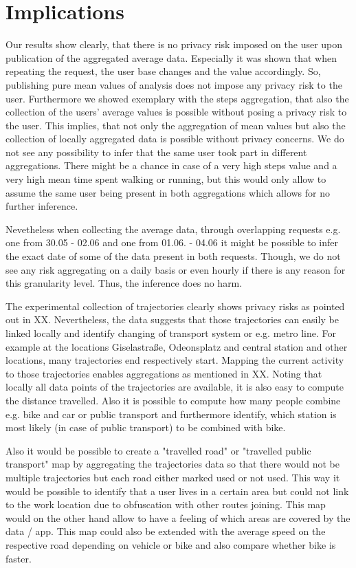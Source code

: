 \section{Implications}
Our results show clearly, that there is no privacy risk imposed on the user upon publication of the aggregated average data. Especially it was shown that when repeating the request, the user base changes and the value accordingly. So, publishing pure mean values of analysis does not impose any privacy risk to the user. Furthermore we showed exemplary with the steps aggregation, that also the collection of the users' average values is possible without posing a privacy risk to the user. This implies, that not only the aggregation of mean values but also the collection of locally aggregated data is possible without privacy concerns. We do not see any possibility to infer that the same user took part in different aggregations. There might be a chance in case of a very high steps value and a very high mean time spent walking or running, but this would only allow to assume the same user being present in both aggregations which allows for no further inference.

Nevetheless when collecting the average data, through overlapping requests e.g. one from 30.05 - 02.06 and one from 01.06. - 04.06 it might be possible to infer the exact date of some of the data present in both requests. Though, we do not see any risk aggregating on a daily basis or even hourly if there is any reason for this granularity level. Thus, the inference does no harm.

The experimental collection of trajectories clearly shows privacy risks as pointed out in XX. Nevertheless, the data suggests that those trajectories can easily be linked locally and identify changing of transport system or e.g. metro line. For example at the locations Giselastraße, Odeonsplatz and central station and other locations, many trajectories end respectively start. Mapping the current activity to those trajectories enables aggregations as mentioned in XX. Noting that locally all data points of the trajectories are available, it is also easy to compute the distance travelled. Also it is possible to compute how many people combine e.g. bike and car or public transport and furthermore identify, which station is most likely (in case of public transport) to be combined with bike.

Also it would be possible to create a "travelled road" or "travelled public transport" map by aggregating the trajectories data so that there would not be multiple trajectories but each road either marked used or not used. This way it would be possible to identify that a user lives in a certain area but could not link to the work location due to obfuscation with other routes joining. This map would on the other hand allow to have a feeling of which areas are covered by the data / app. This map could also be extended with the average speed on the respective road depending on vehicle or bike and also compare whether bike is faster.

